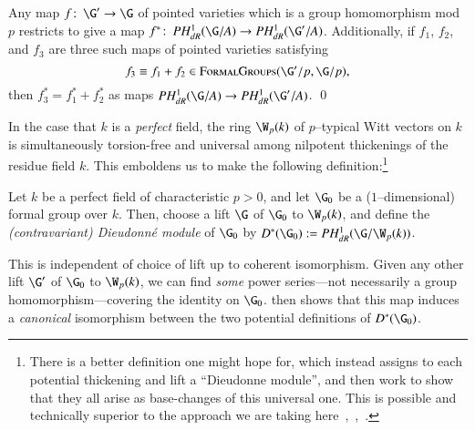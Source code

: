 \begin{corollary}
Any map $f\co \G' \to \G$ of pointed varieties which is a group homomorphism mod $p$ restricts to give a map $f^*\co PH^1_{dR}(\G/A) \to PH^1_{dR}(\G'/A)$.  Additionally, if $f_1$, $f_2$, and $f_3$ are three such maps of pointed varieties satisfying \[f_3 \equiv f_1 + f_2 \in \CatOf{FormalGroups}(\G'/p, \G/p),\] then $f_3^* = f_1^* + f_2^*$ as maps $PH^1_{dR}(\G/A) \to PH^1_{dR}(\G'/A)$. \qed
\end{corollary}

In the case that $k$ is a \emph{perfect} field, the ring $\W_p(k)$ of $p$--typical Witt vectors on $k$ is simultaneously torsion-free and universal among nilpotent thickenings of the residue field $k$.  This emboldens us to make the following definition:\footnote{There is a better definition one might hope for, which instead assigns to each potential thickening and lift a ``Dieudonne module'', and then work to show that they all arise as base-changes of this universal one.  This is possible and technically superior to the approach we are taking here~\cite[Theorem 5.1.6]{Katz},~\cite[Chapter 4]{Messing},~\cite{GrothendieckCristaux}.}

\begin{definition}{\cite[Section 5.5]{Katz}}
Let $k$ be a perfect field of characteristic $p > 0$, and let $\G_0$ be a ($1$--dimensional) formal group over $k$.  Then, choose a lift $\G$ of $\G_0$ to $\W_p(k)$, and define the \textit{(contravariant) Dieudonn\'e module} of $\G_0$ by $D^*(\G_0) := PH^1_{dR}(\G / \W_p(k))$.
\end{definition}

\begin{remark}
This is independent of choice of lift up to coherent isomorphism.  Given any other lift $\G'$ of $\G_0$ to $\W_p(k)$, we can find \emph{some} power series---not necessarily a group homomorphism---covering the identity on $\G_0$.   then shows that this map induces a \emph{canonical} isomorphism between the two potential definitions of $D^*(\G_0)$.
\end{remark}

